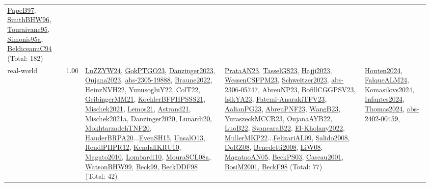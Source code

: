 {\begin{longtable}{p{3cm}r>{\raggedright\arraybackslash}p{6cm}>{\raggedright\arraybackslash}p{6cm}>{\raggedright\arraybackslash}p{8cm}}
\hyperref[detail:PapeB97]{PapeB97}, \hyperref[detail:SmithBHW96]{SmithBHW96}, \hyperref[detail:Touraivane95]{Touraivane95}, \hyperref[detail:Simonis95a]{Simonis95a}, \hyperref[detail:BeldiceanuC94]{BeldiceanuC94} (Total: 182)\\
\index{real-world}\index{Benchmarks!real-world}real-world &  1.00 & \hyperref[detail:LuZZYW24]{LuZZYW24}, \hyperref[detail:GokPTGO23]{GokPTGO23}, \hyperref[detail:Danzinger2023]{Danzinger2023}, \hyperref[detail:Oujana2023]{Oujana2023}, \hyperref[detail:abs-2305-19888]{abs-2305-19888}, \hyperref[detail:Braune2022]{Braune2022}, \hyperref[detail:HeinzNVH22]{HeinzNVH22}, \hyperref[detail:YunusogluY22]{YunusogluY22}, \hyperref[detail:ColT22]{ColT22}, \hyperref[detail:GeibingerMM21]{GeibingerMM21}, \hyperref[detail:KoehlerBFFHPSSS21]{KoehlerBFFHPSSS21}, \hyperref[detail:Mischek2021]{Mischek2021}, \hyperref[detail:Lemos21]{Lemos21}, \hyperref[detail:Astrand21]{Astrand21}, \hyperref[detail:Mischek2021a]{Mischek2021a}, \hyperref[detail:Danzinger2020]{Danzinger2020}, \hyperref[detail:Lunardi20]{Lunardi20}, \hyperref[detail:MokhtarzadehTNF20]{MokhtarzadehTNF20}, \hyperref[detail:HauderBRPA20]{HauderBRPA20}...\hyperref[detail:EvenSH15]{EvenSH15}, \hyperref[detail:UnsalO13]{UnsalO13}, \hyperref[detail:RendlPHPR12]{RendlPHPR12}, \hyperref[detail:KendallKRU10]{KendallKRU10}, \hyperref[detail:Magato2010]{Magato2010}, \hyperref[detail:Lombardi10]{Lombardi10}, \hyperref[detail:MouraSCL08a]{MouraSCL08a}, \hyperref[detail:WatsonBHW99]{WatsonBHW99}, \hyperref[detail:Beck99]{Beck99}, \hyperref[detail:BeckDDF98]{BeckDDF98} (Total: 42) & \hyperref[detail:PrataAN23]{PrataAN23}, \hyperref[detail:TasselGS23]{TasselGS23}, \hyperref[detail:Hajji2023]{Hajji2023}, \hyperref[detail:WessenCSFPM23]{WessenCSFPM23}, \hyperref[detail:Schweitzer2023]{Schweitzer2023}, \hyperref[detail:abs-2306-05747]{abs-2306-05747}, \hyperref[detail:AbreuNP23]{AbreuNP23}, \hyperref[detail:BofillCGGPSV23]{BofillCGGPSV23}, \hyperref[detail:IsikYA23]{IsikYA23}, \hyperref[detail:Fatemi-AnarakiTFV23]{Fatemi-AnarakiTFV23}, \hyperref[detail:AalianPG23]{AalianPG23}, \hyperref[detail:AbreuPNF23]{AbreuPNF23}, \hyperref[detail:WangB23]{WangB23}, \hyperref[detail:YuraszeckMCCR23]{YuraszeckMCCR23}, \hyperref[detail:OujanaAYB22]{OujanaAYB22}, \hyperref[detail:LuoB22]{LuoB22}, \hyperref[detail:SvancaraB22]{SvancaraB22}, \hyperref[detail:El-Kholany2022]{El-Kholany2022}, \hyperref[detail:MullerMKP22]{MullerMKP22}...\hyperref[detail:FelizariAL09]{FelizariAL09}, \hyperref[detail:Salido2008]{Salido2008}, \hyperref[detail:DoRZ08]{DoRZ08}, \hyperref[detail:Benedetti2008]{Benedetti2008}, \hyperref[detail:LiW08]{LiW08}, \hyperref[detail:MagataoAN05]{MagataoAN05}, \hyperref[detail:BeckPS03]{BeckPS03}, \hyperref[detail:Caseau2001]{Caseau2001}, \hyperref[detail:BosiM2001]{BosiM2001}, \hyperref[detail:BeckF98]{BeckF98} (Total: 77) & \hyperref[detail:Houten2024]{Houten2024}, \hyperref[detail:FalqueALM24]{FalqueALM24}, \hyperref[detail:Komasilovs2024]{Komasilovs2024}, \hyperref[detail:Infantes2024]{Infantes2024}, \hyperref[detail:Thomas2024]{Thomas2024}, \hyperref[detail:abs-2402-00459]{abs-2402-00459}, 
\end{longtable}}
